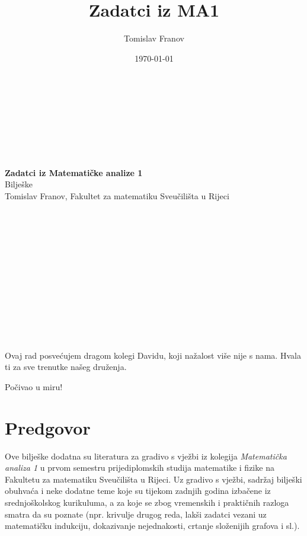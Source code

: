\documentclass{book}
\title{Zadatci iz MA1}
\author{Tomislav Franov}
\date{\today}
\begin{document}
\begin{titlepage}
\begin{center}
\Huge
\textbf{ }\\ \textbf{ }\\ \textbf{ }\\ \textbf{ }\\ \textbf{ }\\ \textbf{ }\\
\textbf{Zadatci iz Matematičke analize 1}\\
\vspace{0.5 cm}
\huge
Bilješke \textbf{ }\\
\vspace{0.5 cm}
\Large
Tomislav Franov, Fakultet za matematiku Sveučilišta u Rijeci
\end{center}
\end{titlepage}
\Large
\newpage
\thispagestyle{empty}
\begin{center}
\textbf{ }\\ \textbf{ }\\ \textbf{ }\\ \textbf{ }\\ \textbf{ }\\ \textbf{ }\\
\textbf{ }\\ \textbf{ }\\ \textbf{ }\\ \textbf{ }\\
\textbf{ }\\ \textbf{ }\\
Ovaj rad posvećujem dragom kolegi Davidu, koji nažalost više nije s nama. Hvala ti za sve trenutke našeg druženja.

Počivao u miru!\\
\end{center}
\large
\vspace{0.5 cm}
\tableofcontents
\thispagestyle{empty}
\chapter*{Predgovor}

Ove bilješke dodatna su literatura za gradivo s vježbi iz kolegija \textit{Matematička analiza 1} u prvom semestru prijediplomskih studija matematike i fizike na Fakultetu za matematiku Sveučilišta u Rijeci. Uz gradivo s vježbi, sadržaj bilješki obuhvaća i neke dodatne teme koje su tijekom zadnjih godina izbačene iz srednjoškolskog kurikuluma, a za koje se zbog vremenskih i praktičnih razloga smatra da su poznate (npr. krivulje drugog reda, lakši zadatci vezani uz matematičku indukciju, dokazivanje nejednakosti, crtanje složenijih grafova i sl.).
\end{document}

